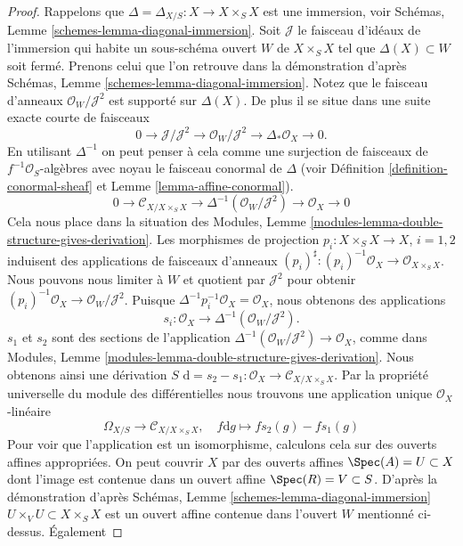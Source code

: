 \begin{proof}
\medskip\noindent
Rappelons que $\Delta = \Delta_{X/S} : X \to X \times_S X$ est une immersion,
voir Schémas, Lemme \ref{schemes-lemma-diagonal-immersion}. Soit $\mathcal{J}$ le faisceau d'idéaux
de l'immersion qui habite un sous-schéma
ouvert $W$ de $X \times_S X$ tel que $\Delta(X) \subset W$
soit fermé. Prenons celui que l'on retrouve dans la
démonstration d'après
Schémas, Lemme \ref{schemes-lemma-diagonal-immersion}. Notez que le faisceau
d'anneaux $\mathcal{O}_W/\mathcal{J}^2$ est supporté sur $\Delta(X)$.
De plus il se situe dans une suite exacte
courte de faisceaux
$$
0 \to \mathcal{J}/\mathcal{J}^2
\to \mathcal{O}_W/\mathcal{J}^2
\to \Delta_*\mathcal{O}_X
\to 0.
$$
En utilisant $\Delta^{-1}$ on peut penser à cela comme
une surjection de faisceaux de $f^{-1}\mathcal{O}_S$-algèbres
avec noyau le faisceau conormal de $\Delta$ (voir Définition
\ref{definition-conormal-sheaf} et Lemme \ref{lemma-affine-conormal}).
$$
0 \to \mathcal{C}_{X/X \times_S X}
\to \Delta^{-1}(\mathcal{O}_W/\mathcal{J}^2)
\to \mathcal{O}_X
\to 0
$$
Cela nous place dans la
situation des Modules, Lemme \ref{modules-lemma-double-structure-gives-derivation}. Les morphismes
de projection $p_i : X \times_S X \to X$, $i = 1, 2$ induisent
des applications
de faisceaux d'anneaux $(p_i)^\sharp : (p_i)^{-1}\mathcal{O}_X \to \mathcal{O}_{X \times_S X}$. Nous pouvons
nous limiter à $W$ et quotient par
$\mathcal{J}^2$ pour obtenir $(p_i)^{-1}\mathcal{O}_X \to \mathcal{O}_W/\mathcal{J}^2$. Puisque
$\Delta^{-1}p_i^{-1}\mathcal{O}_X = \mathcal{O}_X$, nous obtenons des
applications
$$
s_i : \mathcal{O}_X \to \Delta^{-1}(\mathcal{O}_W/\mathcal{J}^2).
$$
$s_1$ et $s_2$ sont des
sections de l'application $\Delta^{-1}(\mathcal{O}_W/\mathcal{J}^2) \to \mathcal{O}_X$, comme dans
Modules, Lemme \ref{modules-lemma-double-structure-gives-derivation}. Nous obtenons ainsi une dérivation
$S$ $\text{d} = s_2 - s_1 : \mathcal{O}_X \to \mathcal{C}_{X/X \times_S X}$.
Par la propriété universelle du module des
différentielles nous trouvons une application unique
$\mathcal{O}_X$-linéaire
$$
\Omega_{X/S} \longrightarrow \mathcal{C}_{X/X \times_S X},\quad
f\text{d}g \longmapsto fs_2(g) - fs_1(g)
$$
Pour voir que l'application est un isomorphisme, calculons cela sur
des ouverts affines appropriées. On peut couvrir $X$
par des ouverts affines $\Spec(A) = U \subset X$ dont l'image est contenue
dans un ouvert affine $\Spec(R) = V \subset S$. D'après la démonstration d'après
Schémas, Lemme \ref{schemes-lemma-diagonal-immersion} $U \times_V U \subset X \times_S X$ est un ouvert
affine contenue dans l'ouvert $W$
mentionné ci-dessus. Également

\end{proof}
